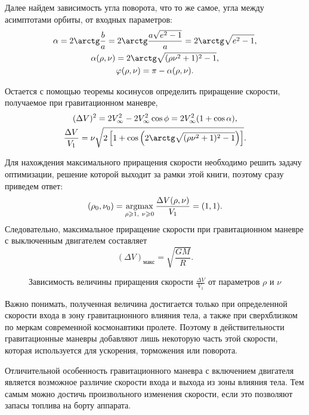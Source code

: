 Далее найдем зависимость угла поворота, что то же самое, угла между асимптотами орбиты, от входных параметров:
\begin{gather*}
    \alpha = 2 \arctg \frac{b}{a} = 2 \arctg \frac{a \sqrt{e^2 - 1}}{a} = 2 \arctg \sqrt{e^2 - 1},\\
    \alpha(\rho, \nu) = 2 \arctg \sqrt{(\rho\nu^2 + 1)^2 - 1},\\
    \varphi(\rho, \nu) = \pi - \alpha( \rho, \nu).
\end{gather*}

Остается с помощью теоремы косинусов определить приращение скорости, получаемое при гравитационном маневре, 
\begin{gather*}
    (\Delta V)^2 = 2 V_\infty^2 - 2 V_\infty^2 \cos \phi = 2 V_\infty^2(1 + \cos \alpha),\\
    \frac{\Delta V}{V_1} = \nu \sqrt{2 \left[ 1 + \cos \left(2 \arctg \sqrt{(\rho\nu^2 + 1)^2 - 1} \right) \right]}. 
\end{gather*}

Для нахождения максимального приращения скорости необходимо решить задачу оптимизации, решение которой выходит за рамки этой книги, поэтому сразу приведем ответ:
\begin{equation*}
    (\rho_0, \nu_0)
        = \underset{\rho \geqslant 1,~\nu \geqslant 0} {\operatorname{argmax}}\, \frac{\Delta V (\rho, \nu)}{V_1} 
        = (1, 1).
\end{equation*}
Следовательно, максимальное приращение скорости при гравитационном маневре с выключенным двигателем составляет
\begin{equation*}
    (\Delta V)_\text{макс}
        = \sqrt{\frac{G M}{R}}.
\end{equation*}

\begin{wrapfigure}[11]{r}{0.45\tw}
    \vspace{-1.2pc}
	\caption{Зависимость величины приращения скорости $\frac{\Delta V}{V_1}$ от параметров $\rho$ и $\nu$}
\end{wrapfigure}
Важно понимать, полученная величина достигается только при определенной скорости входа в зону гравитационного влияния тела, а также при сверхблизком по меркам современной космонавтики пролете. Поэтому в действительности гравитационные маневры добавляют лишь некоторую часть этой скорости, которая используется для ускорения, торможения или поворота.

Отличительной особенность гравитационного маневра с включением двигателя является возможное различие скорости входа и выхода из зоны влияния тела. Тем самым можно достичь произвольного изменения скорости, если это позволяют запасы топлива на борту аппарата.


